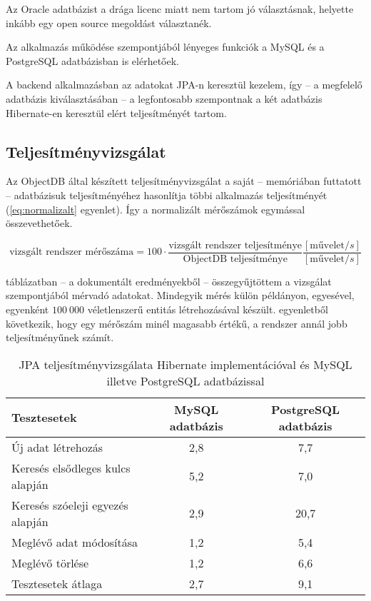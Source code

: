 Az Oracle adatbázist a drága licenc miatt nem tartom jó választásnak, helyette inkább egy open source megoldást választanék.

Az alkalmazás működése szempontjából lényeges funkciók a MySQL és a PostgreSQL adatbázisban is elérhetőek.

A backend alkalmazásban az adatokat JPA-n keresztül kezelem, így --  a megfelelő adatbázis kiválasztásában --   a legfontosabb szempontnak a két adatbázis Hibernate-en keresztül elért teljesítményét tartom.

\subsection{Teljesítményvizsgálat}
Az ObjectDB által készített teljesítményvizsgálat\cite{JPA_benchmark} a saját --  memóriában futtatott --   adatbázisuk teljesítményéhez hasonlítja többi alkalmazás teljesítményét (\ref{eq:normalizalt} egyenlet). Így a normalizált mérőszámok egymással összevethetőek.

\begin{equation}
\textrm{vizsgált rendszer mérőszáma} = 100 \cdot
\frac{\textrm{vizsgált rendszer teljesítménye}}{\textrm{ObjectDB teljesítménye}}
\frac{[\textrm{művelet}/s]}{[\textrm{művelet}/s]}
\label{eq:normalizalt}
\end{equation}

 táblázatban --  a dokumentált eredményekből\cite{JPA_benchmark} --   összegyűjtöttem a vizsgálat szempontjából mérvadó adatokat. Mindegyik mérés külön példányon, egyesével, egyenként $100~000$ véletlenszerű entitás létrehozásával készült.  egyenletből következik, hogy egy mérőszám minél magasabb értékű, a rendszer annál jobb teljesítményűnek számít.

\begin{table}[hbt]
	
	\begin{tabular}{lc|c}
		Tesztesetek & MySQL adatbázis & PostgreSQL adatbázis \\\hline 
		
		Új adat létrehozás & 2,8 & 7,7\\ \hline
		Keresés elsődleges kulcs alapján  & 5,2 & 7,0\\ \hline
		Keresés szóeleji egyezés alapján & 2,9 & 20,7\\ \hline
		Meglévő adat módosítása & 1,2 & 5,4\\ \hline
		Meglévő törlése & 1,2 & 6,6 \\ \hline
		Tesztesetek átlaga & 2,7 & 9,1
	\end{tabular} 
	
	\caption{JPA teljesítményvizsgálata Hibernate implementációval és  MySQL illetve PostgreSQL adatbázissal }
	\label{tabl:teljesitmenyvizsgalat}
\end{table}

